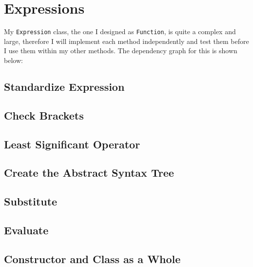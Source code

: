 \documentclass[../../../../main.tex]{subfiles}
\begin{document}
\section{Expressions}
My \texttt{Expression} class, the one I designed as \texttt{Function}, is quite a complex and large, therefore I will implement each method independently and test them before I use them within my other methods. The dependency graph for this is shown below:





\subsection{Standardize Expression}

\subsection{Check Brackets}

\subsection{Least Significant Operator}

\subsection{Create the Abstract Syntax Tree}

\subsection{Substitute}

\subsection{Evaluate}

\subsection{Constructor and Class as a Whole}
\newpage
\end{document}
